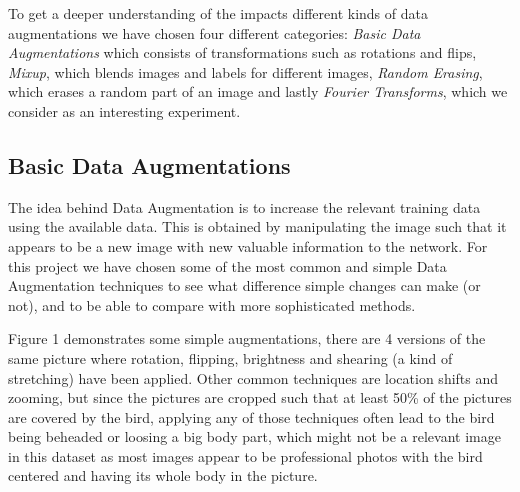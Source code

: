 \documentclass{article}
\begin{document}
To get a deeper understanding of the impacts different kinds of data augmentations 
we have chosen four different categories: \textit{Basic Data Augmentations} which consists of transformations such as rotations and flips, 
 \textit{Mixup}, which blends images and labels for different images, \textit{Random Erasing}, which erases a random part of an image and lastly 
\textit{Fourier Transforms}, which we consider as an interesting experiment.

\subsection{Basic Data Augmentations}
The idea behind Data Augmentation is to increase the relevant training data using the available data. This is obtained by manipulating the image such that it appears to be a new image with new valuable information to the network. For this project we have chosen some of the most common and simple Data Augmentation techniques to see what difference simple changes can make (or not), and to be able to compare with more sophisticated methods. 

Figure 1 demonstrates some simple augmentations, there are 4 versions of the same picture where rotation, flipping, brightness and shearing (a kind of stretching) have been applied. Other common techniques are location shifts and zooming, but since the pictures are cropped such that at least 50\% of the pictures are covered by the bird, applying any of those techniques often lead to the bird being beheaded or loosing a big body part, which might not be a relevant image in this dataset as most images appear to be professional photos with the bird centered and having its whole body in the picture.
\end{document}
